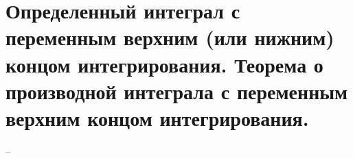 \section{Определенный интеграл с переменным верхним (или нижним) концом интегрирования. Теорема о производной интеграла с переменным верхним концом интегрирования.}
--
\newline